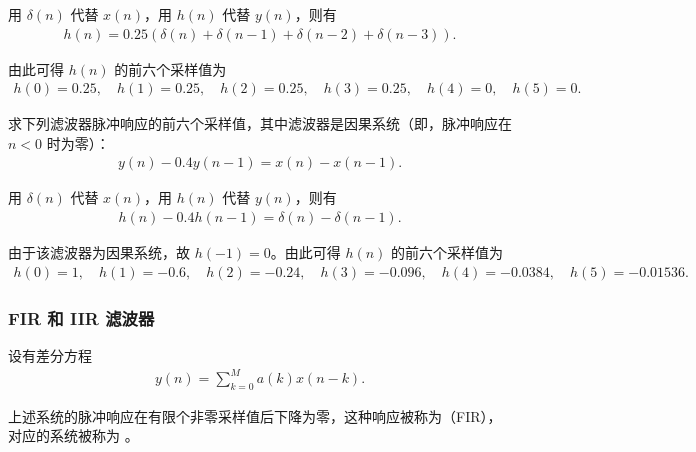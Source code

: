 \begin{solution}
    用 $\delta(n)$ 代替 $x(n)$，用 $h(n)$ 代替 $y(n)$，则有
    \begin{align*}
        h(n) = 0.25(\delta(n) + \delta(n - 1) + \delta(n - 2) + \delta(n - 3)).
    \end{align*}

    由此可得 $h(n)$ 的前六个采样值为
    \begin{align*}
        h(0) = 0.25, \quad
        h(1) = 0.25, \quad
        h(2) = 0.25, \quad
        h(3) = 0.25, \quad
        h(4) = 0, \quad
        h(5) = 0.
    \end{align*}
\end{solution}

\begin{exercise}
    求下列滤波器脉冲响应的前六个采样值，其中滤波器是因果系统（即，脉冲响应在 $n < 0$ 时为零）：
    \begin{align*}
        y(n) - 0.4y(n - 1) = x(n) - x(n - 1).
    \end{align*}
\end{exercise}

\begin{solution}
    用 $\delta(n)$ 代替 $x(n)$，用 $h(n)$ 代替 $y(n)$，则有
    \begin{align*}
        h(n) - 0.4h(n - 1) = \delta(n) - \delta(n - 1).
    \end{align*}

    由于该滤波器为因果系统，故 $h(-1) = 0$。由此可得 $h(n)$ 的前六个采样值为
    \begin{align*}
        h(0) = 1, \quad
        h(1) = -0.6, \quad
        h(2) = -0.24, \quad
        h(3) = -0.096, \quad
        h(4) = -0.0384, \quad
        h(5) = -0.01536.
    \end{align*}
\end{solution}

\subsubsection{FIR 和 IIR 滤波器}

\begin{definition}
    设有差分方程
    \begin{align*}
        y(n) = \sum_{k = 0}^{M}a(k)x(n - k).
    \end{align*}

    上述系统的脉冲响应在有限个非零采样值后下降为零，这种响应被称为（FIR），
    对应的系统被称为 。
\end{definition}

